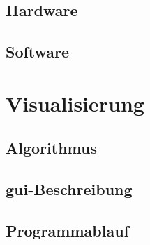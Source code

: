 \subsection{Hardware}
\subsection{Software}
\newpage
\section{Visualisierung}
\subsection{Algorithmus}
\newpage
\subsection{\ac{gui}-Beschreibung}
\newpage
\subsection{Programmablauf}
\newpage